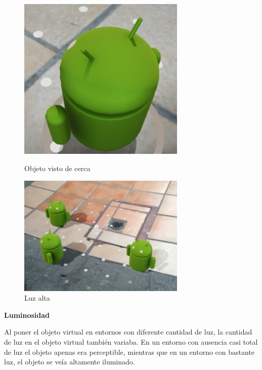 \begin{figure}[!htbp]
	\begin{minipage}{0.48\textwidth}
		\centering
		\includegraphics[width=8cm]{desarrollo/secciones/pruebas/motog6/img/CERCA.png}
		\caption{Objeto visto de cerca}
		\label{fig:motog6cerca}
	\end{minipage}\hfill
	\begin{minipage}{0.48\textwidth}
		\centering
		\includegraphics[width=8cm]{desarrollo/secciones/pruebas/motog6/img/LUZALTA.png}
		\caption{Luz alta}
		\label{fig:motog6lalta}
	\end{minipage}\hfill
\end{figure}

\textbf{Luminosidad} \par
Al poner el objeto virtual en entornos con diferente cantidad de luz, la cantidad de luz en el objeto virtual también variaba. En un entorno con ausencia casi total de luz el objeto apenas era perceptible, mientras que en un entorno con bastante luz, el objeto se veía altamente iluminado.

